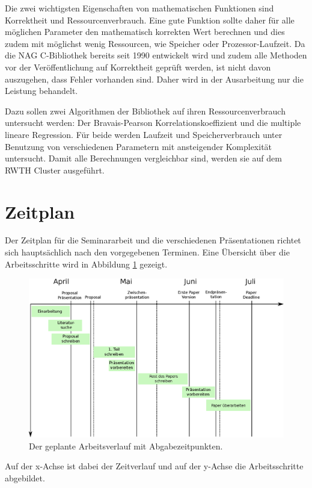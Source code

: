 \documentclass{article}
\begin{document}
Die zwei wichtigsten Eigenschaften von mathematischen Funktionen sind Korrektheit und Ressourcenverbrauch.
Eine gute Funktion sollte daher für alle möglichen Parameter den mathematisch korrekten Wert berechnen und dies zudem mit möglichst wenig Ressourcen, wie Speicher oder Prozessor-Laufzeit.
Da die NAG C-Bibliothek bereits seit 1990 entwickelt wird\cite{Wikipedia:nag} und zudem alle Methoden vor der Veröffentlichung auf Korrektheit geprüft werden\cite{NAG2011}, ist nicht davon auszugehen, dass Fehler vorhanden sind.
Daher wird in der Ausarbeitung nur die Leistung behandelt.

Dazu sollen zwei Algorithmen der Bibliothek auf ihren Ressourcenverbrauch untersucht werden: Der Bravais-Pearson Korrelationskoeffizient und die multiple lineare Regression.
Für beide werden Laufzeit und Speicherverbrauch unter Benutzung von verschiedenen Parametern mit ansteigender Komplexität untersucht.
Damit alle Berechnungen vergleichbar sind, werden sie auf dem RWTH Cluster ausgeführt.

\section{Zeitplan}

Der Zeitplan für die Seminararbeit und die verschiedenen Präsentationen richtet sich hauptsächlich nach den vorgegebenen Terminen.
Eine Übersicht über die Arbeitsschritte wird in Abbildung \ref{fig:Zeitplan} gezeigt.
\begin{figure}[t]
 \includegraphics[width=\linewidth]{./figures/Workplan-adj.eps}
 \caption{Der geplante Arbeitsverlauf mit Abgabezeitpunkten.}
 \label{fig:Zeitplan}
\end{figure}
Auf der x-Achse ist dabei der Zeitverlauf und auf der y-Achse die Arbeitsschritte abgebildet.
\end{document}
